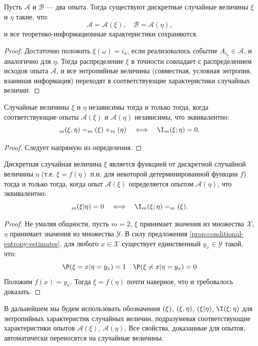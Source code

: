 \begin{proposition}
	Пусть $\mathcal{A}$ и $\mathcal{B}$ --- два опыта. Тогда существуют дискретные случайные величины $\xi$ и $\eta$ такие, что:
	\[
		\mathcal{A} = \mathcal{A}(\xi),\quad \mathcal{B} = \mathcal{A}(\eta),
	\]
	и все теоретико-информационные характеристики сохраняются.
\end{proposition}
\begin{proof}
	Достаточно положить $\xi(\omega) = i_a$, если реализовалось событие $A_{i_a} \in \mathcal{A}$, и аналогично для $\eta$. Тогда распределение $\xi$ в точности совпадает с распределением исходов опыта $\mathcal{A}$, и все энтропийные величины (совместная, условная энтропия, взаимная информация) переходят в соответствующие характеристики случайных величин.
\end{proof}
\begin{corollary}
	Случайные величины $\xi$ и $\eta$ независимы тогда и только тогда, когда соответствующие опыты $\mathcal{A}(\xi)$ и $\mathcal{A}(\eta)$ независимы, что эквивалентно:
	\[
		\H_m(\xi,\eta) = \H_m(\xi) + \H_m(\eta) \quad \Longleftrightarrow \quad \I_m(\xi;\eta) = 0.
	\]
\end{corollary}
\begin{proof}
	Следует напрямую из определения.
\end{proof}
\begin{corollary}
	Дискретная случайная величина $\xi$ является функцией от дискретной случайной величины $\eta$ (т.е. $\xi = f(\eta) \text{ п.н.}$ для некоторой детерминированной функции $f$) тогда и только тогда, когда опыт $\mathcal{A}(\xi)$ определяется опытом $\mathcal{A}(\eta)$, что эквивалентно:
	\[
		\H_m(\xi | \eta) = 0 \quad \Longleftrightarrow \quad \I_m(\xi;\eta) = \H_m(\xi).
	\]
\end{corollary}
\begin{proof}
	Не умаляя общности, пусть $m = 2$, $\xi$ принимает значения из множества $\mathcal{X}$, $\eta$ принимает значения из множества $\mathcal{Y}$. В силу предложения \ref{prop:conditional-entropy-estimates}, для любого $x \in \mathcal{X}$ существует единственный $y_x \in \mathcal{Y}$ такой, что:
	\[
		\P(\xi = x | \eta = y_x) = 1 \quad \P(\xi \neq x | \eta = y_x) = 0
	\]
	Положим $f(x) = y_x$. Тогда $\xi = f(\eta)$ почти наверное, что и требовалось доказать.
\end{proof}
\begin{remark}[О терминологии]
	В дальнейшем мы будем использовать обозначения $\relax(\xi)$, $\relax(\xi,\eta)$, $\relax(\xi|\eta)$, $\I(\xi;\eta)$ для энтропийных характеристик случайных величин, подразумевая соответствующие характеристики опытов $\mathcal{A}(\xi)$, $\mathcal{A}(\eta)$. Все свойства, доказанные для опытов, автоматически переносятся на случайные величины.
\end{remark}

